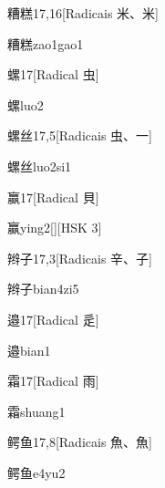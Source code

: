 \begin{entry}{糟糕}{17,16}[Radicais ⽶、⽶]
  \begin{phonetics}{糟糕}{zao1gao1}
  \end{phonetics}
\end{entry}

\begin{entry}{螺}{17}[Radical ⾍]
  \begin{phonetics}{螺}{luo2}
  \end{phonetics}
\end{entry}

\begin{entry}{螺丝}{17,5}[Radicais ⾍、⼀]
  \begin{phonetics}{螺丝}{luo2si1}
  \end{phonetics}
\end{entry}

\begin{entry}{赢}{17}[Radical ⾙]
  \begin{phonetics}{赢}{ying2}[][HSK 3]
  \end{phonetics}
\end{entry}

\begin{entry}{辫子}{17,3}[Radicais ⾟、⼦]
  \begin{phonetics}{辫子}{bian4zi5}
  \end{phonetics}
\end{entry}

\begin{entry}{邉}{17}[Radical ⾡]
  \begin{phonetics}{邉}{bian1}
  \end{phonetics}
\end{entry}

\begin{entry}{霜}{17}[Radical ⾬]
  \begin{phonetics}{霜}{shuang1}
  \end{phonetics}
\end{entry}

\begin{entry}{鳄鱼}{17,8}[Radicais ⿂、⿂]
  \begin{phonetics}{鳄鱼}{e4yu2}
  \end{phonetics}
\end{entry}


